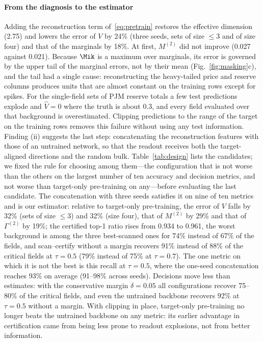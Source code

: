 \paragraph{From the diagnosis to the estimator}
Adding the reconstruction term of~\eqref{eq:pretrain} restores the effective dimension (2.75) and lowers the error of
$V$ by 24\% (three seeds, sets of size $\le3$ and of size four) and that of the marginals by 18\%. At first, $M^{(2)}$ did
not improve (0.027 against 0.021). Because $\Mik$ is a maximum over marginals, its error is governed by the upper tail of
the marginal errors, not by their mean (Fig.~\ref{fig:masking}c), and the tail had a single cause: reconstructing the
heavy-tailed price and reserve columns produces units that are almost constant on the training rows except for spikes.
For the single-field sets of PJM reserve totals a few test predictions explode and $\hat V=0$ where the truth is about
0.3, and every field evaluated over that background is overestimated. Clipping predictions to the range of the target
on the training rows removes this failure without using any test information. Finding (ii) suggests the last step:
concatenating the reconstruction features with those of an untrained network, so that the readout receives both the
target-aligned directions and the random bulk. Table~\ref{tab:design} lists the candidates; we fixed the rule for choosing
among them---the configuration that is not worse than the others on the largest number of ten accuracy and decision
metrics, and not worse than target-only pre-training on any---before evaluating the last candidate. The concatenation with
three seeds satisfies it on nine of ten metrics and is our estimator: relative to target-only pre-training, the error of
$V$ falls by 32\% (sets of size $\le3$) and 32\% (size four), that of $M^{(2)}$ by 29\% and that of $\Gamma^{(2)}$ by 19\%;
the certified top-1 ratio rises from 0.934 to 0.961, the worst background is among the three best-scanned ones for 74\%
instead of 67\% of the fields, and scan--certify without a margin recovers 91\% instead of 88\% of the critical fields at
$\tau=0.5$ (79\% instead of 75\% at $\tau=0.7$). The one metric on which it is not the best is this recall at $\tau=0.5$,
where the one-seed concatenation reaches 93\% on average (91--98\% across seeds). Decisions move less than estimates:
with the conservative margin $\delta=0.05$ all configurations recover 75--80\% of the critical fields, and even the
untrained backbone recovers 92\% at $\tau=0.5$ without a margin. With clipping in place, target-only pre-training no longer
beats the untrained backbone on any metric: its earlier advantage in certification came from being less prone to readout
explosions, not from better information.

